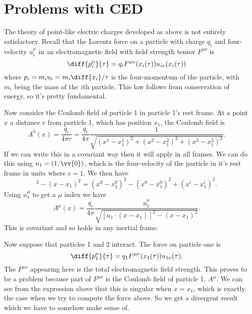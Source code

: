 \documentclass[fleqn]{NotesClass}
\begin{document}
    \section{Problems with CED}
    The theory of point-like electric charges developed as above is not entirely satisfactory.
    Recall that the Lorentz force on a particle with charge \(q_i\) and four-velocity \(u_i^\mu\) in an electromagnetic field with field strength tensor \(F^{\mu\nu}\) is
    \begin{equation}
        \diff{p_i^\mu}{\tau} = q_i F^{\mu\nu}(x_i(\tau)) u_{i\nu}(x_i(\tau))
    \end{equation}
    where \(p_i = m_i u_i = m_i \diff{x_i}/{\tau}\) is the four-momentum of the particle, with \(m_i\) being the mass of the \(i\)th particle.
    This law follows from conservation of energy, so it's pretty fundamental.
    
    Now consider the Coulomb field of particle \(1\) in particle 1's rest frame.
    At a point \(x\) a distance \(r\) from particle 1, which has position \(x_1\), the Coulomb field is
    \begin{equation}
        A^0(x) = \frac{q_i}{4\pi r} = \frac{q_i}{4\pi} \frac{1}{\sqrt{(x^1 - x_1^1)^2 + (x^2 - x_1^2)^2 + (x^3 - x_1^3)^2}}.
    \end{equation}
    If we can write this in a covariant way then it will apply in all frames.
    We can do this using \(u_1 = (1, \vv{0})\), which is the four-velocity of the particle in it's rest frame in units where \(c = 1\).
    We then have
    \begin{equation}
        [u_1 \cdot (x - x_1)]^2 - (x - x_1)^2 = (x^0 - x_1^0)^2 - (x^0 - x_1^0)^2 + (x^i - x_1^i)^2.
    \end{equation}
    Using \(u_1^\mu\) to get a \(\mu\) index we have
    \begin{equation}
        A^\mu(x) = \frac{q_i}{4\pi} \frac{u_1^\mu}{\sqrt{[u_1 \cdot (x - x_1)]^2 - (x - x_1)^2}}.
    \end{equation}
    This is covariant and so holds in any inertial frame.
    
    Now suppose that particles 1 and 2 interact.
    The force on particle one is
    \begin{equation}
        \diff{p_1^\mu}{\tau} = q_1 F^{\mu\nu}(x_1(\tau))u_{1\nu}(\tau).
    \end{equation}
    The \(F^{\mu\nu}\) appearing here is the total electromagnetic field strength.
    This proves to be a problem because part of \(F^{\mu\nu}\) is the Coulomb field of particle 1, \(A^\mu\).
    We can see from the expression above that this is singular when \(x = x_1\), which is exactly the case when we try to compute the force above.
    So we get a divergent result which we have to somehow make sense of.
    
\end{document}

